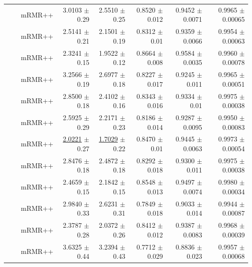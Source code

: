 \begin{longtable}{llp{}rrrrr}
 &  & mRMR++ & 3.0103 {\scriptsize $\pm$ 0.29} & 2.5510 {\scriptsize $\pm$ 0.25} & 0.8520 {\scriptsize $\pm$ 0.012} & 0.9452 {\scriptsize $\pm$ 0.0071} & 0.9965 {\scriptsize $\pm$ 0.00065} \\
 &  & mRMR++ & 2.5141 {\scriptsize $\pm$ 0.21} & 2.1501 {\scriptsize $\pm$ 0.19} & 0.8312 {\scriptsize $\pm$ 0.01} & 0.9359 {\scriptsize $\pm$ 0.0066} & 0.9954 {\scriptsize $\pm$ 0.00063} \\
 &  & mRMR++ & 2.3241 {\scriptsize $\pm$ 0.15} & 1.9522 {\scriptsize $\pm$ 0.12} & 0.8664 {\scriptsize $\pm$ 0.008} & 0.9584 {\scriptsize $\pm$ 0.0035} & 0.9960 {\scriptsize $\pm$ 0.00078} \\
 &  & mRMR++ & 3.2566 {\scriptsize $\pm$ 0.19} & 2.6977 {\scriptsize $\pm$ 0.18} & 0.8227 {\scriptsize $\pm$ 0.017} & 0.9245 {\scriptsize $\pm$ 0.011} & 0.9965 {\scriptsize $\pm$ 0.00051} \\
 &  & mRMR++ & 2.8500 {\scriptsize $\pm$ 0.18} & 2.4102 {\scriptsize $\pm$ 0.16} & 0.8343 {\scriptsize $\pm$ 0.016} & 0.9334 {\scriptsize $\pm$ 0.01} & 0.9975 {\scriptsize $\pm$ 0.00038} \\
 &  & mRMR++ & 2.5925 {\scriptsize $\pm$ 0.29} & 2.2171 {\scriptsize $\pm$ 0.23} & 0.8186 {\scriptsize $\pm$ 0.014} & 0.9287 {\scriptsize $\pm$ 0.0095} & 0.9950 {\scriptsize $\pm$ 0.00083} \\
 &  & mRMR++ & \underline{2.0221} {\scriptsize $\pm$ 0.27} & \underline{1.7029} {\scriptsize $\pm$ 0.22} & 0.8470 {\scriptsize $\pm$ 0.01} & 0.9445 {\scriptsize $\pm$ 0.0063} & 0.9973 {\scriptsize $\pm$ 0.00054} \\
 &  & mRMR++ & 2.8476 {\scriptsize $\pm$ 0.18} & 2.4872 {\scriptsize $\pm$ 0.18} & 0.8292 {\scriptsize $\pm$ 0.018} & 0.9300 {\scriptsize $\pm$ 0.011} & 0.9975 {\scriptsize $\pm$ 0.00038} \\
 &  & mRMR++ & 2.4659 {\scriptsize $\pm$ 0.15} & 2.1842 {\scriptsize $\pm$ 0.15} & 0.8548 {\scriptsize $\pm$ 0.013} & 0.9497 {\scriptsize $\pm$ 0.0074} & 0.9980 {\scriptsize $\pm$ 0.00034} \\
 &  & mRMR++ & 2.9840 {\scriptsize $\pm$ 0.33} & 2.6231 {\scriptsize $\pm$ 0.31} & 0.7849 {\scriptsize $\pm$ 0.018} & 0.9033 {\scriptsize $\pm$ 0.014} & 0.9944 {\scriptsize $\pm$ 0.00087} \\
 &  & mRMR++ & 2.3787 {\scriptsize $\pm$ 0.28} & 2.0372 {\scriptsize $\pm$ 0.26} & 0.8412 {\scriptsize $\pm$ 0.012} & 0.9387 {\scriptsize $\pm$ 0.0083} & 0.9968 {\scriptsize $\pm$ 0.00039} \\
 &  & mRMR++ & 3.6325 {\scriptsize $\pm$ 0.44} & 3.2394 {\scriptsize $\pm$ 0.43} & 0.7712 {\scriptsize $\pm$ 0.029} & 0.8836 {\scriptsize $\pm$ 0.023} & 0.9957 {\scriptsize $\pm$ 0.00068} \\

\end{longtable}
